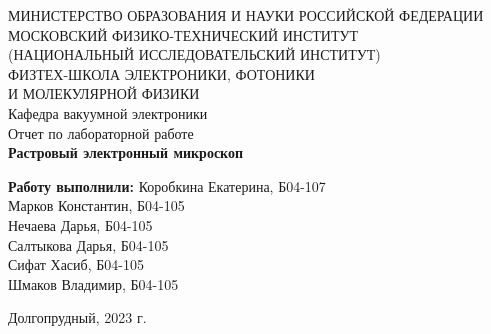 \documentclass[a4paper,12pt]{article}	%
\begin{document}

\begin{titlepage}
	\begin{center}
		\large МИНИСТЕРСТВО ОБРАЗОВАНИЯ И НАУКИ РОССИЙСКОЙ ФЕДЕРАЦИИ\\
		МОСКОВСКИЙ ФИЗИКО-ТЕХНИЧЕСКИЙ ИНСТИТУТ \\
		(НАЦИОНАЛЬНЫЙ ИССЛЕДОВАТЕЛЬСКИЙ ИНСТИТУТ)\\
		ФИЗТЕХ-ШКОЛА ЭЛЕКТРОНИКИ, ФОТОНИКИ \\
		И МОЛЕКУЛЯРНОЙ ФИЗИКИ \\

	\vspace{4.0 cm}
	{Кафедра вакуумной электроники} \\
	\LARGE {Отчет по лабораторной работе} \\
	\LARGE \textbf{Растровый электронный микроскоп} \\
	\end{center}
	\vspace{3 cm} \large

	\begin{flushleft}
		\LARGE \textbf{Работу выполнили:} \hspace{0.8cm}  Коробкина Екатерина, Б04-107 \\
		
		\hspace{7.8cm} Марков Константин, Б04-105 \\
		
            \hspace{7.8cm} Нечаева Дарья, Б04-105 \\
            
            \hspace{7.8cm} Салтыкова Дарья, Б04-105 \\
           
            \hspace{7.8cm} Сифат Хасиб, Б04-105 \\
            
            \hspace{7.8cm} Шмаков Владимир, Б04-105 \\
		
	\end{flushleft}

	\vfill

	\begin{center}
		Долгопрудный, 2023 г.
	\end{center}
\end{titlepage}
\end{document}

